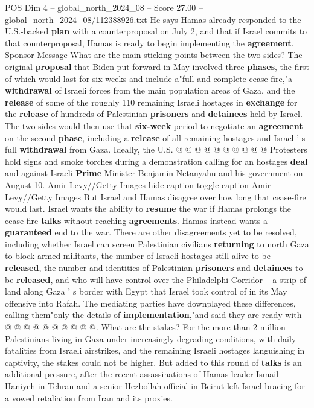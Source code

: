 \begin{textsample}{POS Dim 4 – global\_north\_2024\_08 – Score 27.00 – global\_north\_2024\_08/112388926.txt}
He says Hamas already responded to the U.S.-backed \textbf{plan} with a counterproposal on July 2, and that if Israel commits to that counterproposal, Hamas is ready to begin implementing the \textbf{agreement}.
Sponsor Message What are the main sticking points between the two sides?
The original \textbf{proposal} that Biden put forward in May involved three \textbf{phases}, the first of which would last for six weeks and include a"full and complete cease-fire,"a \textbf{withdrawal} of Israeli forces from the main population areas of Gaza, and the \textbf{release} of some of the roughly 110 remaining Israeli hostages in \textbf{exchange} for the \textbf{release} of hundreds of Palestinian \textbf{prisoners} and \textbf{detainees} held by Israel.
The two sides would then use that \textbf{six-week} period to negotiate an \textbf{agreement} on the second \textbf{phase}, including a \textbf{release} of all remaining hostages and Israel ' s full \textbf{withdrawal} from Gaza.
Ideally, the U.S. @ @ @ @ @ @ @ @ @ @ Protesters hold signs and smoke torches during a demonstration calling for an hostages \textbf{deal} and against Israeli \textbf{Prime} Minister Benjamin Netanyahu and his government on August 10.
Amir Levy//Getty Images hide caption toggle caption Amir Levy//Getty Images But Israel and Hamas disagree over how long that cease-fire would last.
Israel wants the ability to \textbf{resume} the war if Hamas prolongs the cease-fire \textbf{talks} without reaching \textbf{agreements}.
Hamas instead wants a \textbf{guaranteed} end to the war.
There are other disagreements yet to be resolved, including whether Israel can screen Palestinian civilians \textbf{returning} to north Gaza to block armed militants, the number of Israeli hostages still alive to be \textbf{released}, the number and identities of Palestinian \textbf{prisoners} and \textbf{detainees} to be \textbf{released}, and who will have control over the Philadelphi Corridor -- a strip of land along Gaza ' s border with Egypt that Israel took control of in its May offensive into Rafah.
The mediating parties have downplayed these differences, calling them"only the details of \textbf{implementation},"and said they are ready with @ @ @ @ @ @ @ @ @ @.
What are the stakes?
For the more than 2 million Palestinians living in Gaza under increasingly degrading conditions, with daily fatalities from Israeli airstrikes, and the remaining Israeli hostages languishing in captivity, the stakes could not be higher.
But added to this round of \textbf{talks} is an additional pressure, after the recent assassinations of Hamas leader Ismail Haniyeh in Tehran and a senior Hezbollah official in Beirut left Israel bracing for a vowed retaliation from Iran and its proxies.

\end{textsample}
